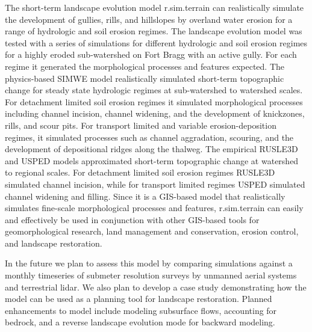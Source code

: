 \documentclass[gmd, manuscript]{copernicus}
\begin{document}
The short-term landscape evolution model 
r.sim.terrain 
can realistically simulate the development of 
gullies, rills, and hillslopes by overland water erosion
for a range of hydrologic and soil erosion regimes.
The landscape evolution model was tested
with a series of simulations for different 
hydrologic and soil erosion regimes
for a highly eroded sub-watershed on Fort Bragg
with an active gully.
For each regime it generated the 
morphological processes and features expected.
The physics-based SIMWE model 
realistically simulated short-term topographic change
for steady state hydrologic regimes
at sub-watershed to watershed scales. 
For detachment limited soil erosion regimes
it simulated morphological processes including
channel incision, channel widening, and 
the development of knickzones, rills, and scour pits.
For transport limited and variable erosion-deposition regimes,
it simulated processes such as channel aggradation,
scouring, and the development of
depositional ridges along the thalweg.
The empirical RUSLE3D and USPED models
approximated short-term topographic change
at watershed to regional scales. 
For detachment limited soil erosion regimes 
RUSLE3D simulated channel incision,
while for transport limited regimes
USPED simulated channel widening and filling. 
Since it is a GIS-based model 
that realistically simulates 
fine-scale morphological processes and features,
r.sim.terrain can easily and effectively be used 
in conjunction with other GIS-based tools
for geomorphological research,
land management and conservation,
erosion control, and landscape restoration. 


In the future we plan to assess this model
by comparing simulations against 
a monthly timeseries
of submeter resolution surveys
by unmanned aerial systems and terrestrial lidar. 
We also plan to develop a case study demonstrating
how the model can be used as a planning tool 
for landscape restoration. 
Planned enhancements to model include 
modeling subsurface flows, 
accounting for bedrock, 
and a reverse landscape evolution mode
for backward modeling. 

\end{document}
